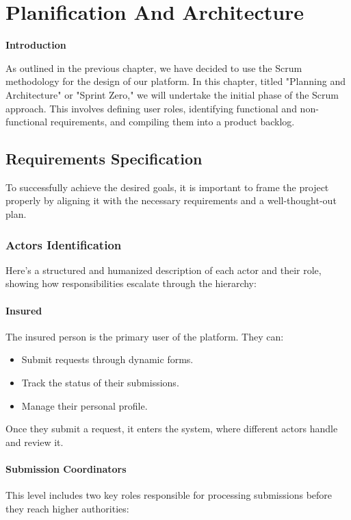 \chapter{Planification And Architecture}
\newpage
\begin{center}
    \doublespacing 
    \centering
    \LARGE\textbf{Introduction} 
     \vspace{1cm} \\
   \raggedright
\end{center}
\Large As outlined in the previous chapter, we have decided to use the Scrum methodology for the design of our platform.  
In this chapter, titled "Planning and Architecture" or "Sprint Zero," we will undertake the initial phase of the Scrum approach. This involves defining user roles, identifying functional and non-functional requirements, and compiling them into a product backlog.

\section{Requirements Specification}
To successfully achieve the desired goals, it is important to frame the project properly by aligning it with the necessary requirements and a well-thought-out plan.
\subsection{Actors Identification}
\Large Here’s a structured and humanized description of each actor and their role, showing how responsibilities escalate through the hierarchy:   

\subsubsection{Insured}
The insured person is the primary user of the platform. They can: 
\begin{itemize}
    \item  Submit requests through dynamic forms.
    \item  Track the status of their submissions.
    \item  Manage their personal profile.
\end{itemize}
Once they submit a request, it enters the system, where different actors handle and review it.  

\subsubsection{Submission Coordinators}  
This level includes two key roles responsible for processing submissions before they reach higher authorities:  

